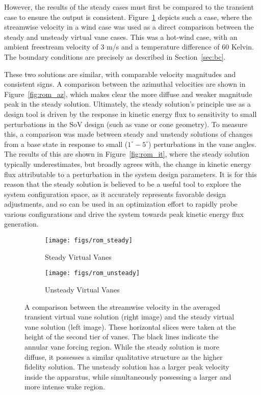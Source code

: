 However, the results of the steady cases must first be
compared to the transient case to ensure the output is consistent. 
Figure~\ref{fig:rom_compare} depicts such a case, where the streamwise
velocity in a wind case was used as a direct comparison between the
steady and unsteady virtual vane cases. This was a hot-wind case, with
an ambient freestream velocity of 3 m/s and a temperature difference of 60
Kelvin. The boundary conditions are precisely as described in
Section~\ref{sec:bc}. 

These two solutions are similar, with comparable velocity magnitudes and 
consistent signs. A comparison between the azimuthal velocities are
shown in Figure~\ref{fig:rom_az}, which makes clear the more diffuse and
weaker magnitude peak in the steady solution. Ultimately, the steady
solution's principle use as a design tool is driven by the response in
kinetic energy flux to sensitivity to small perturbations in the SoV
design (such as vane or cone geometry). To measure this, a comparison
was made between steady and unsteady solutions of changes from a base state 
in response to small ($1^{\circ}-5^{\circ}$) perturbations in the vane
angles. The results of this are shown in Figure~\ref{fig:rom_it}, where
the steady solution typically underestimates, but broadly agrees with,
the change in kinetic energy flux attributable to a perturbation in the
system design parameters.  It is for this reason that the steady
solution is believed to be a useful tool to explore the system
configuration space, as it accurately represents favorable design
adjustments, and so can be used in an optimization effort to rapidly
probe various configurations and drive the system towards peak kinetic
energy flux generation.  

\begin{figure}[htp!]
 \begin{subfigure}{0.49\textwidth}
 \centering
 \texttt{[image: figs/rom\_steady]}
  \caption{Steady Virtual Vanes}
 \end{subfigure}
 \begin{subfigure}{0.49\textwidth}
 \texttt{[image: figs/rom\_unsteady]}%
  \caption{Unsteady Virtual Vanes}
 \end{subfigure}
 \caption{A comparison between the streamwise velocity in the averaged
 transient virtual vane solution (right image) and the steady virtual
 vane solution (left image). These horizontal slices were taken at the
 height of the second tier of vanes. The black lines indicate the
 annular vane forcing region. While the steady solution is more diffuse,
 it possesses a similar qualitative structure as the higher fidelity
 solution. The unsteady solution has a larger peak velocity inside the
 apparatus, while simultaneously possessing a larger and more intense
 wake region.}
 \label{fig:rom_compare}  
\end{figure}

